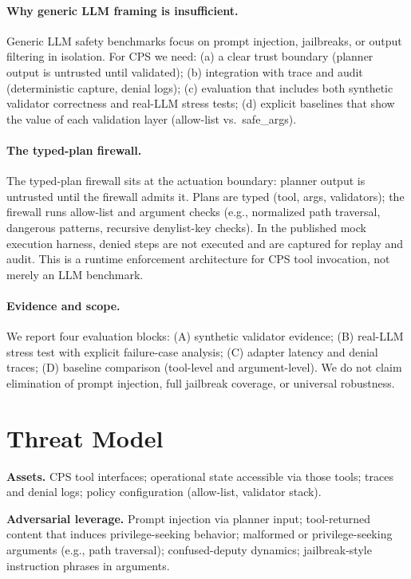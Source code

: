\documentclass[sigconf]{acmart}
\begin{document}
\paragraph{Why generic LLM framing is insufficient.}
Generic LLM safety benchmarks focus on prompt injection, jailbreaks, or output filtering in isolation. For CPS we need: (a) a clear trust boundary (planner output is untrusted until validated); (b) integration with trace and audit (deterministic capture, denial logs); (c) evaluation that includes both synthetic validator correctness and real-LLM stress tests; (d) explicit baselines that show the value of each validation layer (allow-list vs.\ safe\_args).

\paragraph{The typed-plan firewall.}
The typed-plan firewall sits at the actuation boundary: planner output is untrusted until the firewall admits it. Plans are typed (tool, args, validators); the firewall runs allow-list and argument checks (e.g., normalized path traversal, dangerous patterns, recursive denylist-key checks). In the published mock execution harness, denied steps are not executed and are captured for replay and audit. This is a runtime enforcement architecture for CPS tool invocation, not merely an LLM benchmark.

\paragraph{Evidence and scope.}
We report four evaluation blocks: (A) synthetic validator evidence; (B) real-LLM stress test with explicit failure-case analysis; (C) adapter latency and denial traces; (D) baseline comparison (tool-level and argument-level). We do not claim elimination of prompt injection, full jailbreak coverage, or universal robustness.

\section{Threat Model}

\textbf{Assets.} CPS tool interfaces; operational state accessible via those tools; traces and denial logs; policy configuration (allow-list, validator stack).

\textbf{Adversarial leverage.} Prompt injection via planner input; tool-returned content that induces privilege-seeking behavior; malformed or privilege-seeking arguments (e.g., path traversal); confused-deputy dynamics; jailbreak-style instruction phrases in arguments.
\end{document}
